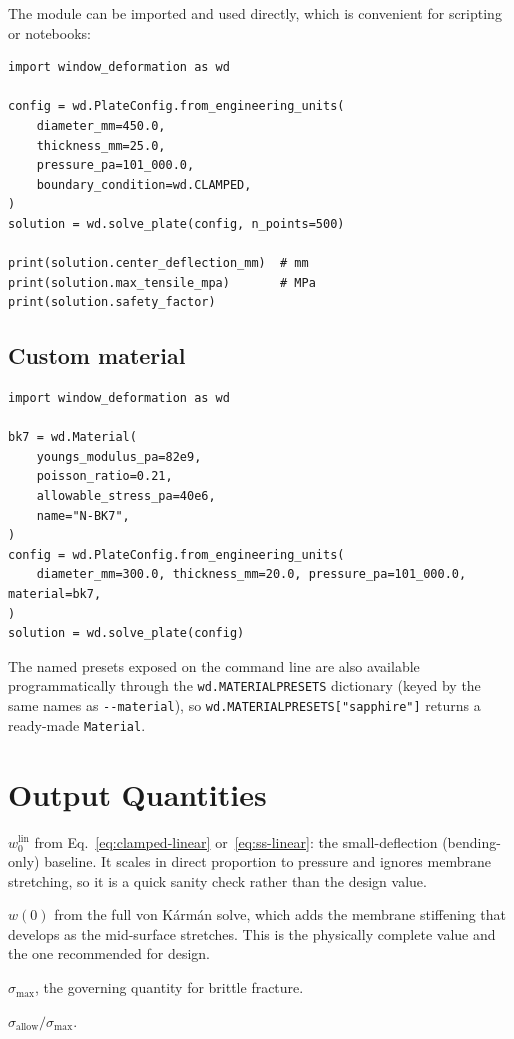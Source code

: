 \documentclass[11pt]{article}
\newcommand{\codeus}{\textunderscore\allowbreak}
\DeclareRobustCommand{\code}[1]{\texttt{\ifmmode\else\renewcommand{\_}{\codeus}\fi#1}}
\begin{document}
The module can be imported and used directly, which is convenient for scripting or
notebooks:

\begin{lstlisting}[style=pystyle]
import window_deformation as wd

config = wd.PlateConfig.from_engineering_units(
    diameter_mm=450.0,
    thickness_mm=25.0,
    pressure_pa=101_000.0,
    boundary_condition=wd.CLAMPED,
)
solution = wd.solve_plate(config, n_points=500)

print(solution.center_deflection_mm)  # mm
print(solution.max_tensile_mpa)       # MPa
print(solution.safety_factor)
\end{lstlisting}

\subsection{Custom material}

\begin{lstlisting}[style=pystyle]
import window_deformation as wd

bk7 = wd.Material(
    youngs_modulus_pa=82e9,
    poisson_ratio=0.21,
    allowable_stress_pa=40e6,
    name="N-BK7",
)
config = wd.PlateConfig.from_engineering_units(
    diameter_mm=300.0, thickness_mm=20.0, pressure_pa=101_000.0, material=bk7,
)
solution = wd.solve_plate(config)
\end{lstlisting}

\noindent The named presets exposed on the command line are also available
programmatically through the \code{wd.MATERIAL\_PRESETS} dictionary (keyed by the
same names as \code{-{}-material}), so \code{wd.MATERIAL\_PRESETS["sapphire"]}
returns a ready-made \code{Material}.

\section{Output Quantities}

\begin{description}[style=nextline]
  \item[Linear center deflection] $w_{0}^{\text{lin}}$ from
    Eq.~\eqref{eq:clamped-linear} or~\eqref{eq:ss-linear}: the small-deflection
    (bending-only) baseline. It scales in direct proportion to pressure and
    ignores membrane stretching, so it is a quick sanity check rather than the
    design value.
  \item[Nonlinear center deflection] $w(0)$ from the full von K\'arm\'an solve,
    which adds the membrane stiffening that develops as the mid-surface stretches.
    This is the physically complete value and the one recommended for design.
  \item[Peak tensile stress] $\sigma_{\max}$, the governing quantity for brittle
    fracture.
  \item[Safety factor] $\sigma_{\text{allow}} / \sigma_{\max}$.
\end{description}
\end{document}
